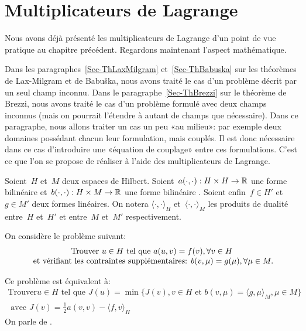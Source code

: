 \medskip
\section{Multiplicateurs de Lagrange}\label{Sec-MultLag}
Nous avons déjà présenté les multiplicateurs de Lagrange d'un point de vue pratique au chapitre précédent. Regardons maintenant l'aspect mathématique.

Dans les paragraphes~\ref{Sec-ThLaxMilgram} et~\ref{Sec-ThBabuska} sur les théorèmes de Lax-Milgram et de Babuška, nous avons traité le cas d'un problème décrit par un seul champ inconnu. Dans le paragraphe~\ref{Sec-ThBrezzi} sur le théorème de Brezzi, nous avons traité le cas d'un problème formulé avec deux champs inconnus (mais on pourrait l'étendre à autant de champs que nécessaire).
Dans ce paragraphe, nous allons traiter un cas un peu «au milieu»: par exemple deux domaines possédant chacun leur formulation, mais couplés. Il est donc nécessaire dans ce cas d'introduire une «équation de couplage» entre ces formulations. C'est ce que l'on se propose de réaliser à l'aide des multiplicateurs de Lagrange.

\medskip
\begin{definition}
Soient~$H$ et~$M$ deux espaces de Hilbert.
Soient~$a(\cdot,\cdot): H\times H\rightarrow\mathbb R$ une forme bilinéaire 
et~$b(\cdot,\cdot): H\times M\rightarrow\mathbb R$ une forme bilinéaire .
Soient enfin~$f\in H'$ et~$g\in M'$ deux formes linéaires. On notera
$\langle\cdot,\cdot\rangle_H$ et~$\langle\cdot,\cdot\rangle_M$ les produits de dualité entre~$H$ et~$H'$
et entre~$M$ et~$M'$ respectivement.

\medskip
On considère le problème suivant:
\begin{equation}
\begin{array}{c}
\text{Trouver } u\in H \text{ tel que } a(u,v)=f(v), \forall v\in H \\
\text{ et vérifiant les
contraintes supplémentaires: } b(v,\mu)=g(\mu), \forall \mu\in M.
\end{array}
\end{equation}

\medskip
Ce problème est équivalent à:
\begin{equation}\label{Eq-Pmin}
\begin{array}{c}
\text{Trouver} u\in H \text{ tel que }
J(u)=\min\{J(v), v\in H \text{ et } b(v,\mu)=\langle g,\mu\rangle_M, \mu\in M\} \\[+3mm]
\text{ avec }
J(v)=\frac12 a(v,v)-\langle f,v\rangle_H
\end{array}
\end{equation}
On parle de .
\end{definition}

